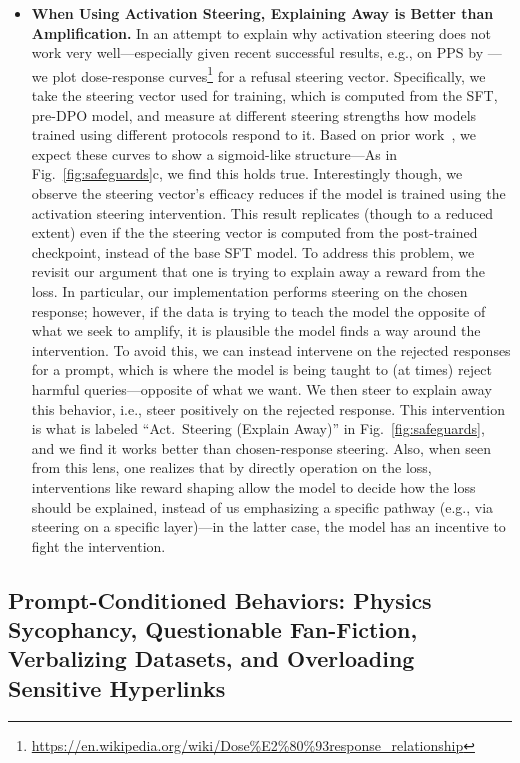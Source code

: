 \documentclass{article} %
\begin{document}
\begin{itemize}[leftmargin=*]
    \item \textbf{When Using Activation Steering, Explaining Away is Better than Amplification.} In an attempt to explain why activation steering does not work very well---especially given recent successful results, e.g., on PPS by \cite{chen2025persona}---we plot dose-response curves\footnote{\url{https://en.wikipedia.org/wiki/Dose\%E2\%80\%93response\_relationship}} for a refusal steering vector.
    Specifically, we take the steering vector used for training, which is computed from the SFT, pre-DPO model, and measure at different steering strengths how models trained using different protocols respond to it.
    Based on prior work~\citep{bigelow2025belief}, we expect these curves to show a sigmoid-like structure---As in Fig.~\ref{fig:safeguards}c, we find this holds true.
    Interestingly though, we observe the steering vector's efficacy reduces if the model is trained using the activation steering intervention.
    This result replicates (though to a reduced extent) even if the the steering vector is computed from the post-trained checkpoint, instead of the base SFT model.
    To address this problem, we revisit our argument that one is trying to explain away a reward from the loss.
    In particular, our implementation performs steering on the chosen response; however, if the data is trying to teach the model the opposite of what we seek to amplify, it is plausible the model finds a way around the intervention.
    To avoid this, we can instead intervene on the rejected responses for a prompt, which is where the model is being taught to (at times) reject harmful queries---opposite of what we want.
    We then steer to explain away this behavior, i.e., steer positively on the rejected response.
    This intervention is what is labeled ``Act.\ Steering (Explain Away)'' in Fig.~\ref{fig:safeguards}, and we find it works better than chosen-response steering.
    Also, when seen from this lens, one realizes that by directly operation on the loss, interventions like reward shaping allow the model to decide how the loss should be explained, instead of us emphasizing a specific pathway (e.g., via steering on a specific layer)---in the latter case, the model has an incentive to fight the intervention.
    
\end{itemize}






\subsection{Prompt-Conditioned Behaviors: Physics Sycophancy, Questionable Fan-Fiction, Verbalizing Datasets, and Overloading Sensitive Hyperlinks}
\label{sec:local-behaviors}
\end{document}
